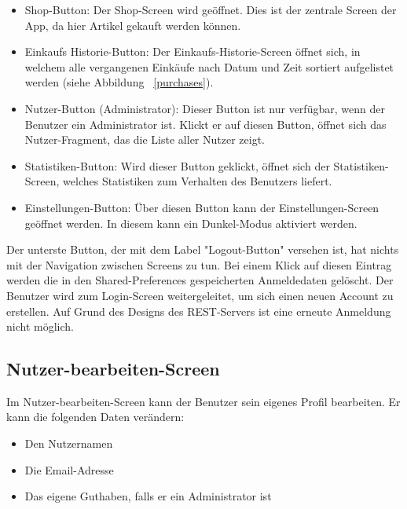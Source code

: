 \begin{itemize}
	\item Shop-Button: Der Shop-Screen wird geöffnet.
	Dies ist der zentrale Screen der App, da hier Artikel gekauft werden können.

	\item Einkaufs Historie-Button: Der Einkaufs-Historie-Screen öffnet sich, in welchem alle vergangenen Einkäufe nach Datum und Zeit sortiert aufgelistet werden (siehe Abbildung ~\ref{purchases}).

	\item Nutzer-Button (Administrator): Dieser Button ist nur verfügbar, wenn der Benutzer ein Administrator ist.
	Klickt er auf diesen Button, öffnet sich das Nutzer-Fragment, das die Liste aller Nutzer zeigt.

	\item Statistiken-Button: Wird dieser Button geklickt, öffnet sich der Statistiken-Screen, welches Statistiken zum Verhalten des Benutzers liefert.

	\item Einstellungen-Button: Über diesen Button kann der Einstellungen-Screen geöffnet werden.
	In diesem kann ein Dunkel-Modus aktiviert werden.

\end{itemize}

Der unterste Button, der mit dem Label "Logout-Button" versehen ist, hat nichts mit der Navigation zwischen Screens zu tun.
Bei einem Klick auf diesen Eintrag werden die in den Shared-Preferences gespeicherten Anmeldedaten gelöscht.
Der Benutzer wird zum Login-Screen weitergeleitet, um sich einen neuen Account zu erstellen.
Auf Grund des Designs des REST-Servers ist eine erneute Anmeldung nicht möglich.

\subsection{Nutzer-bearbeiten-Screen} \label{subsec:edit-user-screen}

Im Nutzer-bearbeiten-Screen kann der Benutzer sein eigenes Profil bearbeiten.
Er kann die folgenden Daten verändern:

\begin{itemize}
	\item Den Nutzernamen
	\item Die Email-Adresse
	\item Das eigene Guthaben, falls er ein Administrator ist
\end{itemize}

